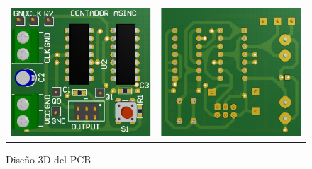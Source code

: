\begin{figure}[H]
    \centering
    \begin{tabular}{c c}
        \includegraphics[scale=0.45]{../EJ7/Recursos/3d_top_asincronico.PNG} &
        \includegraphics[scale=0.45]{../EJ7/Recursos/3d_bottom_asincronico.PNG} 
    \end{tabular}
    \caption{Dise\~no 3D del PCB}
    \label{fig:3d_asincronico}
\end{figure}

